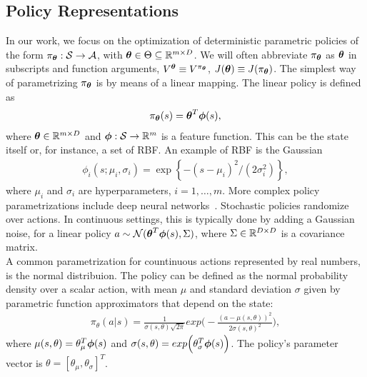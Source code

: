 \subsection{Policy Representations} \label{subsec:polrep}
In our work, we focus on the optimization of deterministic parametric policies of the form $\pi_{\boldsymbol{\theta}}:\mathcal{S}\to\mathcal{A}$, with $\boldsymbol{\theta}\in\Theta\subseteq\mathbb{R}^{m\times D}$. We will often abbreviate $\pi_{\boldsymbol{\theta}}$ as $\boldsymbol{\theta}$ in subscripts and function arguments, \eg $V^{\boldsymbol{\theta}} \equiv V^{\pi_{\boldsymbol{\theta}}}$, $J(\boldsymbol{\theta}) \equiv J(\pi_{\boldsymbol{\theta}})$. The simplest way of parametrizing $\pi_{\boldsymbol{\theta}}$ is by means of a linear mapping. The linear policy is defined as 
\begin{align} \pi_{\boldsymbol{\theta}}(s) = \boldsymbol{\theta}^T\boldsymbol{\phi}(s), \end{align} where $\boldsymbol{\theta}\in\mathbb{R}^{m\times D}$ and $\boldsymbol{\phi}:\mathcal{S}\to\mathbb{R}^m$ is a feature function. This can be the state itself or, for instance, a set of \acf{RBF}. An example of RBF is the Gaussian
\begin{align} \phi_i(s; \mu_i, \sigma_i) = \exp\left\{-{(s -\mu_i)^2}\big/{(2\sigma_i^2)}\right\}, \end{align}
where $\mu_i$ and $\sigma_i$ are hyperparameters, $i=1,\dots,m$. More complex policy parametrizations include deep neural networks~\citep{duan2016benchmarking}. 
Stochastic policies randomize over actions. In continuous settings, this is typically done by adding a Gaussian noise, \eg for a linear policy $a\sim\mathcal{N}(\boldsymbol{\theta}^T\boldsymbol{\phi}(s),\Sigma)$, where $\Sigma\in\mathbb{R}^{D\times D}$ is a covariance matrix.\\
\newline
A common parametrization for countinuous actions represented by real numbers, is the normal distribuion. The policy can be defined as the normal probability density over a scalar action, with mean $\mu$ and standard deviation $\sigma$ given by parametric function approximators that depend on the state:
\begin{align} \pi_{\theta}(a|s) = \frac{1}{\sigma(s, \theta)\sqrt{2\pi}}exp\Big( -\frac{(a -\mu(s, \theta))^2}{2\sigma(s, \theta)^2}\Big), \end{align}
where $\mu(s, \theta) = \theta_{\mu}^{T} \boldsymbol{\phi}(s)$ and $\sigma(s, \theta) = exp\Big( \theta_{\sigma}^{T}\boldsymbol{\phi}(s) \Big)$. The policy's parameter vector is $\theta = [\theta_{\mu}, \theta_{\sigma}]^{T}$.

